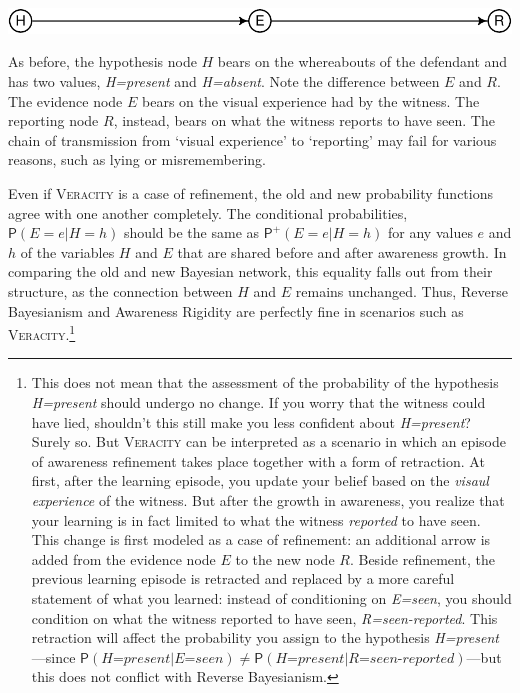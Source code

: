\documentclass[
  11pt,
  dvipsnames,enabledeprecatedfontcommands]{scrartcl}
\newcommand{\pr}[1]{\ensuremath{\mathsf{P}(#1)}}
\newcommand{\ppr}[2]{\ensuremath{\mathsf{P}^{#1}(#2)}}
\begin{document}
\begin{center}\includegraphics[width=0.5\linewidth,height=0.3\textheight]{ReplyToSteeleStefansson2_files/figure-latex/veracityDAG-1} \end{center}

\noindent As before, the hypothesis node \(H\) bears on the whereabouts
of the defendant and has two values, \textit{H=present} and
\textit{H=absent}. Note the difference between \(E\) and \(R\). The
evidence node \(E\) bears on the visual experience had by the witness.
The reporting node \(R\), instead, bears on what the witness reports to
have seen. The chain of transmission from `visual experience' to
`reporting' may fail for various reasons, such as lying or
misremembering.

Even if \textsc{Veracity} is a case of refinement, the old and new
probability functions agree with one another completely. The conditional
probabilities, \(\pr{E=e \vert H=h}\) should be the same as
\(\ppr{+}{E=e \vert H=h}\) for any values \(e\) and \(h\) of the
variables \(H\) and \(E\) that are shared before and after awareness
growth. In comparing the old and new Bayesian network, this equality
falls out from their structure, as the connection between \(H\) and
\(E\) remains unchanged. Thus, Reverse Bayesianism and Awareness
Rigidity are perfectly fine in scenarios such as
\textsc{Veracity}.\footnote{ This does not mean that the assessment of
  the probability of the hypothesis \textit{H=present} should undergo no
  change. If you worry that the witness could have lied, shouldn't this
  still make you less confident about \textit{H=present}? Surely so. But
  \textsc{Veracity} can be interpreted as a scenario in which an episode
  of awareness refinement takes place together with a form of
  retraction. At first, after the learning episode, you update your
  belief based on the \textit{visaul experience} of the witness. But
  after the growth in awareness, you realize that your learning is in
  fact limited to what the witness \textit{reported} to have seen. This
  change is first modeled as a case of refinement: an additional arrow
  is added from the evidence node \(E\) to the new node \(R\). Beside
  refinement, the previous learning episode is retracted and replaced by
  a more careful statement of what you learned: instead of conditioning
  on \textit{E=seen}, you should condition on what the witness reported
  to have seen, \textit{R=seen-reported}. This retraction will affect
  the probability you assign to the hypothesis
  \textit{H=present}---since
  \(\pr{\textit{H=present}\vert \textit{E=seen}}\neq \pr{\textit{H=present}\vert \textit{R=seen-reported}}\)---but
  this does not conflict with Reverse Bayesianism.}
\end{document}

